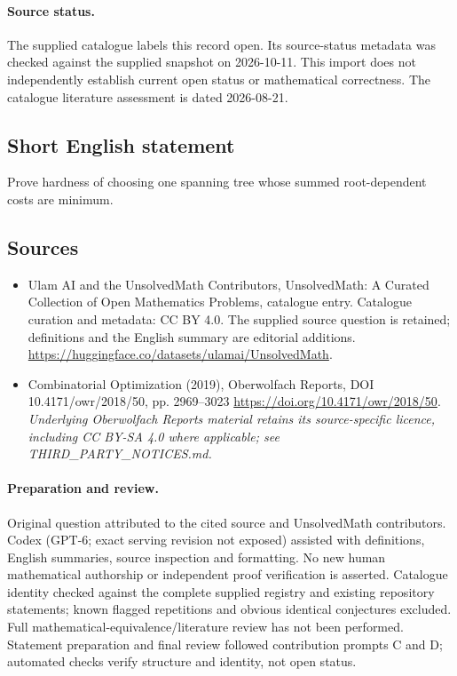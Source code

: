 \documentclass[11pt]{article}
\begin{document}
\paragraph{Source status.}
The supplied catalogue labels this record open. Its source-status metadata was checked against the supplied snapshot on 2026-10-11. This import does not independently establish current open status or mathematical correctness. The catalogue literature assessment is dated 2026-08-21.
\subsection{Short English statement}
Prove hardness of choosing one spanning tree whose summed root-dependent costs are minimum.
\subsection{Sources}
\begin{itemize}
\item[\hypertarget{source:statement:1}{S1}] Ulam AI and the UnsolvedMath Contributors, UnsolvedMath: A Curated Collection of Open Mathematics Problems, catalogue entry. Catalogue curation and metadata: CC BY 4.0. The supplied source question is retained; definitions and the English summary are editorial additions.
\url{https://huggingface.co/datasets/ulamai/UnsolvedMath}.
\item[\hypertarget{source:statement:2}{S2}] Combinatorial Optimization (2019), Oberwolfach Reports, DOI 10.4171/owr/2018/50, pp. 2969--3023
\url{https://doi.org/10.4171/owr/2018/50}.
\textit{Underlying Oberwolfach Reports material retains its source-specific licence, including CC BY-SA 4.0 where applicable; see THIRD\_PARTY\_NOTICES.md.}
\end{itemize}
\paragraph{Preparation and review.}
Original question attributed to the cited source and UnsolvedMath contributors. Codex (GPT-6; exact serving revision not exposed) assisted with definitions, English summaries, source inspection and formatting. No new human mathematical authorship or independent proof verification is asserted. Catalogue identity checked against the complete supplied registry and existing repository statements; known flagged repetitions and obvious identical conjectures excluded. Full mathematical-equivalence/literature review has not been performed. Statement preparation and final review followed contribution prompts C and D; automated checks verify structure and identity, not open status.
\label{end:statement}
\end{document}
